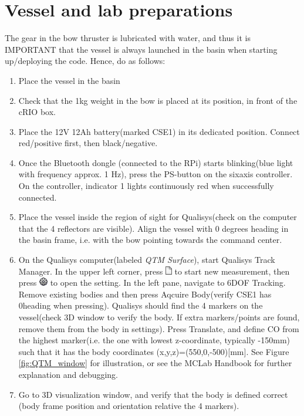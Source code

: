 \section{Vessel and lab preparations}
The gear in the bow thruster is lubricated with water, and thus it is IMPORTANT that the vessel is always launched in the basin when starting up/deploying the code. Hence, do as follows: 
\begin{enumerate}
	\item Place the vessel in the basin
	\item Check that the 1kg weight in the bow is placed at its position, in front of the cRIO box. 
	\item Place the 12V 12Ah battery(marked CSE1) in its dedicated position. Connect red/positive first, then black/negative.  
	\item Once the Bluetooth dongle (connected to the RPi) starts blinking(blue light with frequency approx. 1 Hz), press the PS-button on the sixaxis controller. On the controller, indicator 1 lights continuously red when successfully connected. 
	\item Place the vessel inside the region of sight for Qualisys(check on the computer that the 4 reflectors are visible). Align the vessel with 0 degrees heading in the basin frame, i.e. with the bow pointing towards the command center. 
	\item On the Qualisys computer(labeled \textit{QTM Surface}), start Qualisys Track Manager. In the upper left corner, press \includegraphics{fig/new_measurement.png} to start new measurement, then press \includegraphics{fig/project_options.png} to open the setting. In the left pane, navigate to 6DOF Tracking. Remove existing bodies and then press Aqcuire Body(verify CSE1 has 0\degree heading when pressing). Qualisys should find the 4 markers on the vessel(check 3D window to verify the body. If extra markers/points are found, remove them from the body in settings). Press Translate, and define CO from the highest marker(i.e. the one with lowest z-coordinate, typically -150mm) such that it has the body coordinates (x,y,z)=(550,0,-500)[mm].  See Figure \ref{fig:QTM_window} for illustration, or see the MCLab Handbook for further explanation and debugging. 
	\item Go to 3D visualization window, and verify that the body is defined correct (body frame position and orientation relative the 4 markers).
\end{enumerate}
